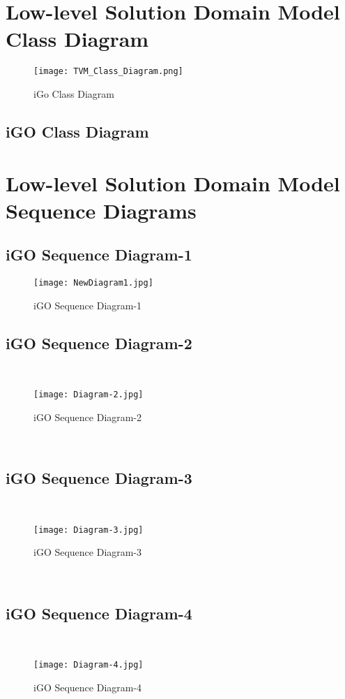 \documentclass[a4paper,12pt]{report}
\begin{document}
\section{Low-level Solution Domain Model Class Diagram}
\begin{figure}[h!]
  \centering
   \texttt{[image: TVM\_Class\_Diagram.png]}
  \caption{iGo Class Diagram}
\end{figure}
\subsection{iGO Class Diagram}
\section{Low-level Solution Domain Model Sequence Diagrams}
\subsection{iGO Sequence Diagram-1}

\begin{figure}[h!]
  \centering
   \texttt{[image: NewDiagram1.jpg]}
  \caption{iGO Sequence Diagram-1}
\end{figure}

\subsection{iGO Sequence Diagram-2}
\item \
\begin{figure}[h!]
  \centering
   \texttt{[image: Diagram-2.jpg]}
  \caption{iGO Sequence Diagram-2}
\end{figure}

\
\subsection{iGO Sequence Diagram-3}
\item \
\begin{figure}[h!]
  \centering
   \texttt{[image: Diagram-3.jpg]}
  \caption{iGO Sequence Diagram-3}
\end{figure}

\
\newline
\newline
\newline
\subsection{iGO Sequence Diagram-4}
\item \
\begin{figure}[h!]
  \centering
   \texttt{[image: Diagram-4.jpg]}
  \caption{iGO Sequence Diagram-4}
\end{figure}
\end{document}
